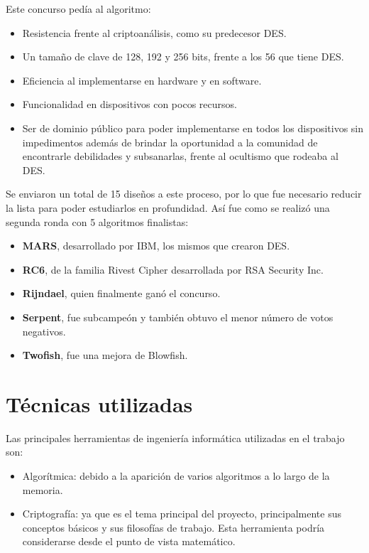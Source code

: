Este concurso pedía al algoritmo:
\begin{itemize}
	\item Resistencia frente al criptoanálisis, como su predecesor DES.
	\item Un tamaño de clave de 128, 192 y 256 bits, frente a los 56 que tiene DES.
	\item Eficiencia al implementarse en hardware y en software.
	\item Funcionalidad en dispositivos con pocos recursos.
	\item Ser de dominio público para poder implementarse en todos los dispositivos sin impedimentos además de brindar la oportunidad a la comunidad de encontrarle debilidades y subsanarlas, frente al ocultismo que rodeaba al DES.
\end{itemize}

Se enviaron un total de 15 diseños a este proceso, por lo que fue necesario reducir la lista para poder estudiarlos en profundidad. Así fue como se realizó una segunda ronda con 5 algoritmos finalistas:
\begin{itemize}
	\item \textbf{MARS}, desarrollado por IBM, los mismos que crearon DES.
	\item \textbf{RC6}, de la familia Rivest Cipher desarrollada por RSA Security Inc.
	\item \textbf{Rijndael}, quien finalmente ganó el concurso.
	\item \textbf{Serpent}, fue subcampeón y también obtuvo el menor número de votos negativos.
	\item \textbf{Twofish}, fue una mejora de Blowfish.
\end{itemize}

\section{Técnicas utilizadas}
Las principales herramientas de ingeniería informática utilizadas en el trabajo son:
\begin{itemize}
	\item Algorítmica: debido a la aparición de varios algoritmos a lo largo de la memoria.
	\item Criptografía: ya que es el tema principal del proyecto, principalmente sus conceptos básicos y sus filosofías de trabajo. Esta herramienta podría considerarse desde el punto de vista matemático.
\end{itemize}

